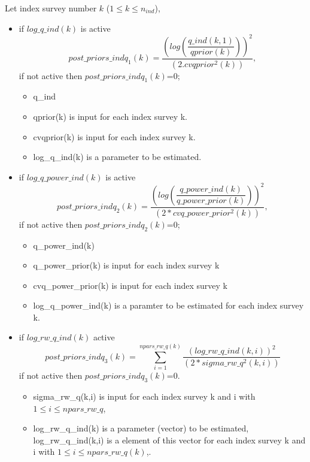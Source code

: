 \documentclass{article}
\begin{document}
Let index survey  number $k$ ($1\leq k \leq n_{ind}$),
\begin{itemize}
    \item if $log\_q\_ind(k)$ is active
    \begin{equation}
        post\_priors\_indq_1(k) = \dfrac{\left(log\left(\dfrac{q\_ind(k,1)}{qprior(k)}\right)\right)^2}{(2.cvqprior^2(k))},
    \end{equation}
    if not active then $post\_priors\_indq_1(k)$=0;
    \begin{itemize}
        \item q\_ind
        \item qprior(k) is input for each index survey k.
        \item cvqprior(k) is input for each index survey k.
        \item log\_q\_ind(k) is a parameter to be estimated.
    \end{itemize}
    \item if $log\_q\_power\_ind(k)$ is active
    \begin{equation}
        post\_priors\_indq_2(k) = \dfrac{\left(log\left(\dfrac{q\_power\_ind(k)}{q\_power\_prior(k)}\right)\right)^2}{(2*cvq\_power\_prior^2(k))},
    \end{equation}
    if not active then $post\_priors\_indq_2(k)$=0;
    \begin{itemize}
    \item q\_power\_ind(k)
    \item q\_power\_prior(k) is input for each index survey k
    \item cvq\_power\_prior(k) is input for each index survey k
    \item log\_q\_power\_ind(k) is a paramter to be estimated for each index survey k.
    \end{itemize}
    \item if $log\_rw\_q\_ind(k)$ active
    \begin{equation}
        post\_priors\_indq_3(k) = \sum_{i=1}^{npars\_rw\_q(k)}\dfrac{(log\_rw\_q\_ind(k,i))^2}{(2*sigma\_rw\_q^2(k,i))}
    \end{equation}
    if not active then $post\_priors\_indq_3(k)$=0.
    \begin{itemize}
    
    \item sigma\_rw\_q(k,i) is input for each index survey k and i with $1\leq i \leq npars\_rw\_q$,
    \item log\_rw\_q\_ind(k) is a parameter (vector) to be estimated, log\_rw\_q\_ind(k,i) is a element of this vector for each index survey k and i with $1\leq i \leq npars\_rw\_q(k)$,.
    \end{itemize}
    
    
    
    \end{itemize}
\end{document}
